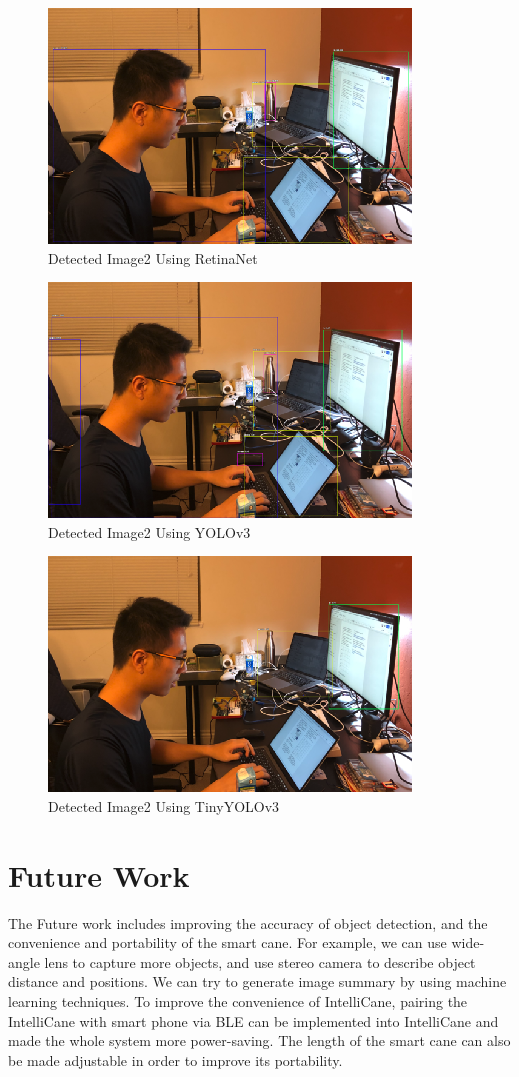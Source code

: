\begin{figure}
  \includegraphics{figure6} 
  \caption{Detected Image2 Using RetinaNet}
\end{figure}

\begin{figure}
  \includegraphics{figure8} 
  \caption{Detected Image2 Using YOLOv3}
\end{figure}

\begin{figure}
  \includegraphics{figure7}
  \caption{Detected Image2 Using TinyYOLOv3}
\end{figure}

\section{Future Work}
The Future work includes improving the accuracy of object detection, and the convenience and portability of the smart cane. For example, we can use wide-angle lens to capture more objects, and use stereo camera to describe object distance and positions. We can try to generate image summary by using machine learning techniques. To improve the convenience of IntelliCane, pairing the IntelliCane with smart phone via BLE can be implemented into IntelliCane and made the whole system more power-saving. The length of the smart cane can also be made adjustable in order to improve its portability.


